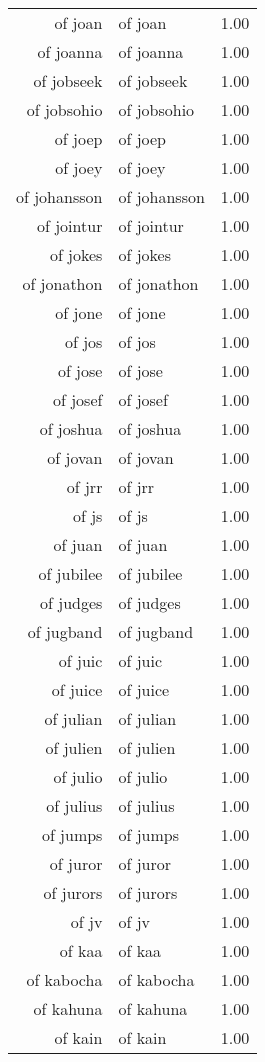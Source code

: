 \begin{table}[ht]
\begin{tabular}{rlr}
  of joan & of joan & 1.00 \\ 
  of joanna & of joanna & 1.00 \\ 
  of jobseek & of jobseek & 1.00 \\ 
  of jobsohio & of jobsohio & 1.00 \\ 
  of joep & of joep & 1.00 \\ 
  of joey & of joey & 1.00 \\ 
  of johansson & of johansson & 1.00 \\ 
  of jointur & of jointur & 1.00 \\ 
  of jokes & of jokes & 1.00 \\ 
  of jonathon & of jonathon & 1.00 \\ 
  of jone & of jone & 1.00 \\ 
  of jos & of jos & 1.00 \\ 
  of jose & of jose & 1.00 \\ 
  of josef & of josef & 1.00 \\ 
  of joshua & of joshua & 1.00 \\ 
  of jovan & of jovan & 1.00 \\ 
  of jrr & of jrr & 1.00 \\ 
  of js & of js & 1.00 \\ 
  of juan & of juan & 1.00 \\ 
  of jubilee & of jubilee & 1.00 \\ 
  of judges & of judges & 1.00 \\ 
  of jugband & of jugband & 1.00 \\ 
  of juic & of juic & 1.00 \\ 
  of juice & of juice & 1.00 \\ 
  of julian & of julian & 1.00 \\ 
  of julien & of julien & 1.00 \\ 
  of julio & of julio & 1.00 \\ 
  of julius & of julius & 1.00 \\ 
  of jumps & of jumps & 1.00 \\ 
  of juror & of juror & 1.00 \\ 
  of jurors & of jurors & 1.00 \\ 
  of jv & of jv & 1.00 \\ 
  of kaa & of kaa & 1.00 \\ 
  of kabocha & of kabocha & 1.00 \\ 
  of kahuna & of kahuna & 1.00 \\ 
  of kain & of kain & 1.00 \\ 

\end{tabular}
\end{table}

